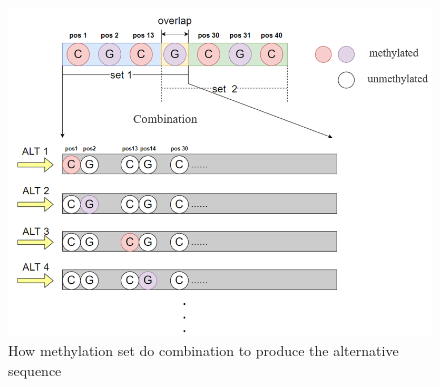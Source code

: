 \documentclass{PHlab-thesis}
\begin{document}
\begin{figure}[h]
  \centering
  \includegraphics[scale=0.8]{figures/meth_set_v2.PNG}
  \caption{How methylation set do combination to produce the alternative sequence}
  \label{fig:meth_set}
\end{figure}
\vfill
\vfill
\end{document}
